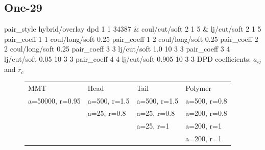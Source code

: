 \documentclass[a4paper]{article}
\begin{document}
\subsection*{One-29}
pair\_style hybrid/overlay dpd 1 1 34387 \& coul/cut/soft 2 1 5 \& 
lj/cut/soft 2 1 5\newline
pair\_coeff 1 1 coul/long/soft 0.25\newline
pair\_coeff 1 2 coul/long/soft 0.25\newline
pair\_coeff 2 2 coul/long/soft 0.25\newline
pair\_coeff 3 3 lj/cut/soft 1.0   10 3 3\newline
pair\_coeff 3 4 lj/cut/soft 0.05  10 3 3\newline
pair\_coeff 4 4 lj/cut/soft 0.905 10 3 3\newline
DPD coefficients: $a_{ij}$ and $r_c$
\begin{figure}[H]\begin{tabular}{llll}
MMT             & Head         & Tail         & Polymer      \\
a=50000, r=0.95 & a=500, r=1.5 & a=500, r=1.5 & a=500, r=0.8 \\
                & a=25,  r=0.8 & a=25,  r=0.8 & a=200, r=0.8 \\
                &              & a=25,  r=1   & a=200, r=1   \\
                &              &              & a=200, r=1   \\
\end{tabular}\end{figure}
\end{document}
